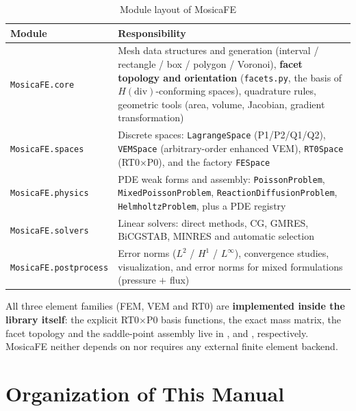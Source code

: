 \documentclass[11pt,oneside]{book}
\theoremstyle{definition}
\theoremstyle{plain}
\newenvironment{important}{%
  \begin{tcolorbox}[colback=blue!5,colframe=blue!45,title=Key Point,fonttitle=\bfseries]%
}{%
  \end{tcolorbox}%
}
\newcommand{\mosica}{\textsf{MosicaFE}}
\newcommand{\code}[1]{\texttt{#1}}
\newcommand{\module}[1]{\texttt{MosicaFE.#1}}
\begin{document}
\begin{table}[htbp]
\centering
\caption{Module layout of \mosica{}}
\label{tab:modules}
\begin{lrbox}{\guideTableBox}
\begin{tabular}{@{}lp{10.4cm}@{}}
\toprule
Module & Responsibility \\
\midrule
\module{core} & Mesh data structures and generation (interval / rectangle / box /
polygon / Voronoi), \textbf{facet topology and orientation} (\code{facets.py}, the
basis of $H(\mathrm{div})$-conforming spaces), quadrature rules, geometric tools
(area, volume, Jacobian, gradient transformation) \\
\module{spaces} & Discrete spaces: \code{LagrangeSpace} (P1/P2/Q1/Q2),
\code{VEMSpace} (arbitrary-order enhanced VEM), \code{RT0Space} (RT0$\times$P0), and the
factory \code{FESpace} \\
\module{physics} & PDE weak forms and assembly: \code{PoissonProblem},
\code{MixedPoissonProblem}, \code{ReactionDiffusionProblem},
\code{HelmholtzProblem}, plus a PDE registry \\
\module{solvers} & Linear solvers: direct methods, CG, GMRES, BiCGSTAB, MINRES and
automatic selection \\
\module{postprocess} & Error norms ($L^2$ / $H^1$ / $L^\infty$), convergence studies,
visualization, and error norms for mixed formulations (pressure $+$ flux) \\
\bottomrule
\end{tabular}
\end{lrbox}%
\ifdim\wd\guideTableBox>\linewidth
  \resizebox{\linewidth}{!}{\usebox{\guideTableBox}}%
\else\usebox{\guideTableBox}\fi
\end{table}

\begin{important}
All three element families (FEM, VEM and RT0) are \textbf{implemented inside the
library itself}: the explicit RT0$\times$P0 basis functions, the exact mass matrix,
the facet topology and the saddle-point assembly live in ,
 and , respectively.
\mosica{} neither depends on nor requires any external finite element backend.
\end{important}

\section{Organization of This Manual}
\end{document}
